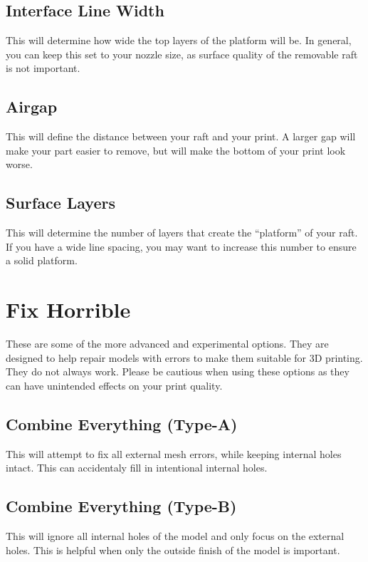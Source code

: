 \subsection{Interface Line Width}
This will determine how wide the top layers of the platform will be. In general, you can keep this set to your nozzle size, as surface quality of the removable raft is not important.

\subsection{Airgap}
This will define the distance between your raft and your print. A larger gap will make your part easier to remove, but will make the bottom of your print look worse.

\subsection{Surface Layers}
This will determine the number of layers that create the “platform” of your raft. If you have a wide line spacing, you may want to increase this number to ensure a solid platform. 

\section{Fix Horrible}
These are some of the more advanced and experimental options. They are designed to help repair models with errors to make them suitable for 3D printing. They do not always work. Please be cautious when using these options as they can have unintended effects on your print quality.

\subsection{Combine Everything (Type-A)}
This will attempt to fix all external mesh errors, while keeping internal holes intact. This can accidentaly fill in intentional internal holes.

\subsection{Combine Everything (Type-B)}
This will ignore all internal holes of the model and only focus on the external holes. This is helpful when only the outside finish of the model is important.

